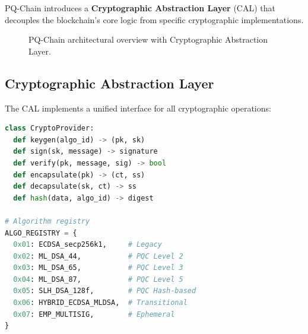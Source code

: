 \documentclass[12pt, a4paper, twocolumn]{article}
\begin{document}
PQ-Chain introduces a \textbf{Cryptographic Abstraction Layer} (CAL) that decouples the blockchain's core logic from specific cryptographic implementations.

\begin{figure}[t]
\centering
{}
\caption{PQ-Chain architectural overview with Cryptographic Abstraction Layer.}
\label{fig:architecture}
\end{figure}

\subsection{Cryptographic Abstraction Layer}

The CAL implements a unified interface for all cryptographic operations:

\begin{lstlisting}[language=Python, caption={CAL Interface (Pseudocode)}]
class CryptoProvider:
  def keygen(algo_id) -> (pk, sk)
  def sign(sk, message) -> signature
  def verify(pk, message, sig) -> bool
  def encapsulate(pk) -> (ct, ss)
  def decapsulate(sk, ct) -> ss
  def hash(data, algo_id) -> digest

# Algorithm registry
ALGO_REGISTRY = {
  0x01: ECDSA_secp256k1,     # Legacy
  0x02: ML_DSA_44,           # PQC Level 2
  0x03: ML_DSA_65,           # PQC Level 3
  0x04: ML_DSA_87,           # PQC Level 5
  0x05: SLH_DSA_128f,        # PQC Hash-based
  0x06: HYBRID_ECDSA_MLDSA,  # Transitional
  0x07: EMP_MULTISIG,        # Ephemeral
}
\end{lstlisting}
\end{document}
